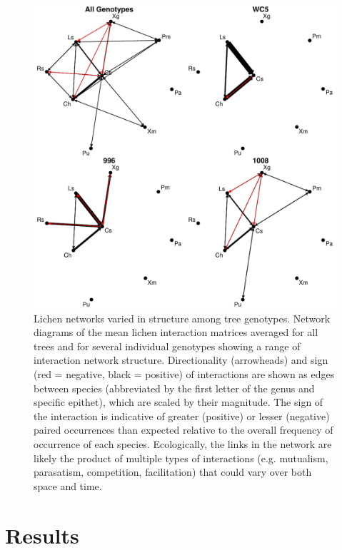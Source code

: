 \documentclass[11pt,twocolumn,twoside,lineno]{pnas-new}
\begin{document}
\begin{figure}[ht]
\centering
\includegraphics[width=\linewidth]{cn_onc.pdf}
\caption{Lichen networks varied in structure among tree
  genotypes. Network diagrams of the mean lichen interaction matrices
  averaged for all trees and for several individual genotypes showing
  a range of interaction network structure. Directionality
  (arrowheads) and sign (red = negative, black = positive) of
  interactions are shown as edges between species (abbreviated by the
  first letter of the genus and specific epithet), which are scaled by
  their magnitude. The sign of the interaction is indicative of
  greater (positive) or lesser (negative) paired occurrences than
  expected relative to the overall frequency of occurrence of each
  species. Ecologically, the links in the network are likely the
  product of multiple types of interactions (e.g. mutualism,
  parasatism, competition, facilitation) that could vary over both
  space and time.}
\label{fig:geno_nets}
\end{figure}

\section*{Results}




\end{document}
